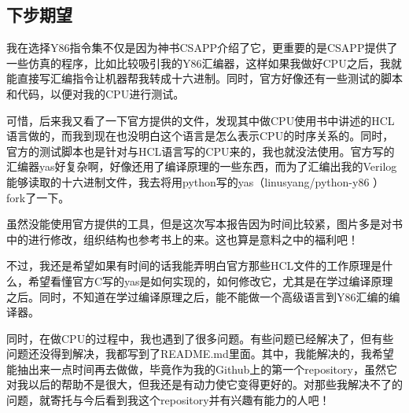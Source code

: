 \subsection{下步期望}\label{ux4e0bux6b65ux671fux671b}

我在选择Y86指令集不仅是因为神书CSAPP介绍了它，更重要的是CSAPP提供了一些仿真的程序，比如比较吸引我的Y86汇编器，这样如果我做好CPU之后，我就能直接写汇编指令让机器帮我转成十六进制。同时，官方好像还有一些测试的脚本和代码，以便对我的CPU进行测试。

可惜，后来我又看了一下官方提供的文件，发现其中做CPU使用书中讲述的HCL语言做的，而我到现在也没明白这个语言是怎么表示CPU的时序关系的。同时，官方的测试脚本也是针对与HCL语言写的CPU来的，我也就没法使用。官方写的汇编器yas好复杂啊，好像还用了编译原理的一些东西，而为了汇编出我的Verilog能够读取的十六进制文件，我去将用python写的yas（linusyang/python-y86
）fork了一下。

虽然没能使用官方提供的工具，但是这次写本报告因为时间比较紧，图片多是对书中的进行修改，组织结构也参考书上的来。这也算是意料之中的福利吧！

不过，我还是希望如果有时间的话我能弄明白官方那些HCL文件的工作原理是什么，希望看懂官方C写的yas是如何实现的，如何修改它，尤其是在学过编译原理之后。同时，不知道在学过编译原理之后，能不能做一个高级语言到Y86汇编的编译器。

同时，在做CPU的过程中，我也遇到了很多问题。有些问题已经解决了，但有些问题还没得到解决，我都写到了README.md里面。其中，我能解决的，我希望能抽出来一点时间再去做做，毕竟作为我的Github上的第一个repository，虽然它对我以后的帮助不是很大，但我还是有动力使它变得更好的。对那些我解决不了的问题，就寄托与今后看到我这个repository并有兴趣有能力的人吧！
